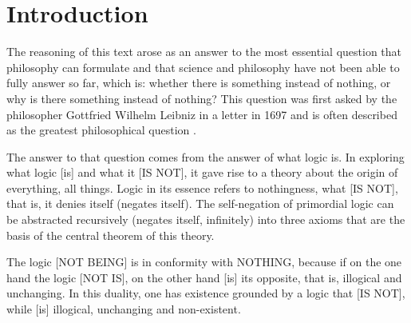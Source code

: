 \section*{Introduction}

The reasoning of this text arose as an answer to the most essential question that philosophy can formulate and that science and philosophy have not been able to fully answer so far, which is: whether there is something instead of nothing, or why is there something instead of nothing? 
This question was first asked by the philosopher Gottfried Wilhelm Leibniz in a letter in 1697 and is often described as the greatest philosophical question \cite{leibniz_origin_of_things}.

The answer to that question comes from the answer of what logic is. In exploring what logic [is] and what it [IS NOT], it gave rise to a theory about the origin of everything, all things. Logic in its essence refers to nothingness, what [IS NOT], that is, it denies itself (negates itself). The self-negation of primordial logic can be abstracted recursively (negates itself, infinitely) into three axioms that are the basis of the central theorem of this theory.

The logic [NOT BEING] is in conformity with NOTHING, because if on the one hand the logic [NOT IS], on the other hand [is] its opposite, that is, illogical and unchanging. In this duality, one has existence grounded by a logic that [IS NOT], while [is] illogical, unchanging and non-existent. 

